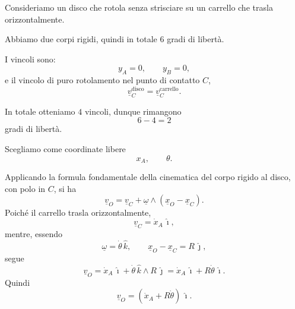 \begin{examplebreak}{}
Consideriamo un disco che rotola senza strisciare su un carrello che trasla orizzontalmente.

\begin{figure}
\end{figure}

Abbiamo due corpi rigidi, quindi in totale $6$ gradi di libertà.

I vincoli sono:
\[
y_A=0,\qquad y_B=0,
\]
e il vincolo di puro rotolamento nel punto di contatto $C$,
\[
\underline{v}_C^{\text{disco}}=\underline{v}_C^{\text{carrello}}.
\]

In totale otteniamo $4$ vincoli, dunque rimangono
\[
6-4=2
\]
gradi di libertà.

Scegliamo come coordinate libere
\[
x_A,\qquad \theta.
\]

Applicando la formula fondamentale della cinematica del corpo rigido al disco, con polo in $C$, si ha
\[
\underline{v}_O=\underline{v}_C+\underline{\omega}\wedge(\underline{x}_O-\underline{x}_C).
\]
Poiché il carrello trasla orizzontalmente,
\[
\underline{v}_C=\dot{x}_A\,\hat{\imath},
\]
mentre, essendo
\[
\underline{\omega}=\dot{\theta}\,\hat{k},
\qquad
\underline{x}_O-\underline{x}_C=R\,\hat{\jmath},
\]
segue
\[
\underline{v}_O=\dot{x}_A\,\hat{\imath}+\dot{\theta}\,\hat{k}\wedge R\,\hat{\jmath}
=\dot{x}_A\,\hat{\imath}+R\dot{\theta}\,\hat{\imath}.
\]
Quindi
\[
\underline{v}_O=(\dot{x}_A+R\dot{\theta})\,\hat{\imath}.
\]
\end{examplebreak}

